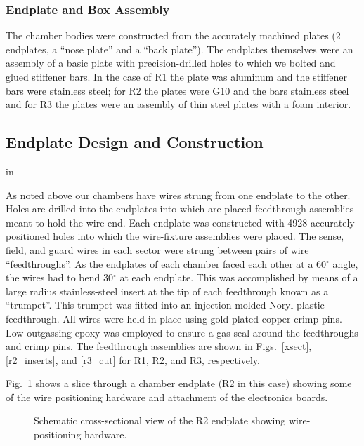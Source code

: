 \subsubsection{Endplate and Box Assembly}


The chamber bodies were constructed from the accurately machined plates
(2 endplates, a ``nose plate'' and a ``back plate'').
The endplates themselves were an assembly of a basic plate with precision-drilled
holes to which we bolted and glued stiffener bars.  In the case of
R1 the plate was aluminum and the stiffener bars were stainless steel;
for R2 the plates were G10 and the bars stainless steel and for R3
the plates were an assembly of thin steel plates with a foam interior.

\subsection{Endplate Design and Construction}
 in

As noted above our chambers have wires strung from one endplate to 
the other.  Holes are drilled into the endplates into which are
placed feedthrough assemblies meant to hold the wire end.
Each endplate was constructed with 4928 accurately positioned holes into 
which the 
wire-fixture assemblies were placed.  The sense, field, and guard wires in each 
sector were strung between pairs of wire ``feedthroughs''.  As the endplates of 
each chamber faced each other at a 60$^{\circ}$ angle, the wires had to bend 
30$^{\circ}$ at each endplate.  This was accomplished by means of a large radius 
stainless-steel insert at the tip of each feedthrough known as a ``trumpet''.
This trumpet was fitted into an injection-molded Noryl plastic feedthrough.  
All wires were held in place using gold-plated copper crimp pins.  
Low-outgassing epoxy was employed to ensure a gas seal around the feedthroughs 
and crimp pins.  The feedthrough assemblies
are shown in Figs.~\ref{xsect}, \ref{r2_inserts}, and \ref{r3_cut} for R1, R2, 
and R3, respectively.

Fig.~\ref{dc-corner} shows a slice through a chamber endplate (R2 in this case)
showing some of the wire positioning hardware and attachment of the electronics 
boards.
\begin{figure}[htpb]   
\vspace{4.5cm}Schematic cross-sectional view of the R2 endplate showing
wire-positioning hardware.
\caption{\small{}}
\label{dc-corner}
\end{figure}   



